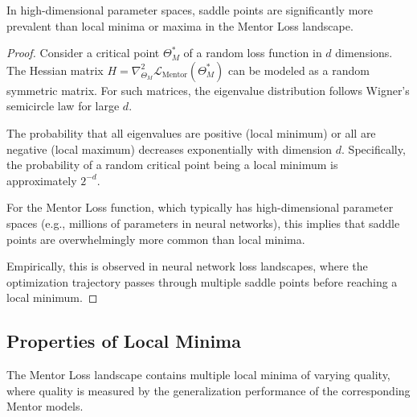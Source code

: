 \begin{theorem}
In high-dimensional parameter spaces, saddle points are significantly more prevalent than local minima or maxima in the Mentor Loss landscape.
\end{theorem}

\begin{proof}
Consider a critical point $\Theta_M^*$ of a random loss function in $d$ dimensions. The Hessian matrix $H = \nabla^2_{\Theta_M} \mathcal{L}_{\text{Mentor}}(\Theta_M^*)$ can be modeled as a random symmetric matrix. For such matrices, the eigenvalue distribution follows Wigner's semicircle law for large $d$.

The probability that all eigenvalues are positive (local minimum) or all are negative (local maximum) decreases exponentially with dimension $d$. Specifically, the probability of a random critical point being a local minimum is approximately $2^{-d}$.

For the Mentor Loss function, which typically has high-dimensional parameter spaces (e.g., millions of parameters in neural networks), this implies that saddle points are overwhelmingly more common than local minima.

Empirically, this is observed in neural network loss landscapes, where the optimization trajectory passes through multiple saddle points before reaching a local minimum.
\end{proof}

\subsection{Properties of Local Minima}

\begin{theorem}
The Mentor Loss landscape contains multiple local minima of varying quality, where quality is measured by the generalization performance of the corresponding Mentor models.
\end{theorem}

